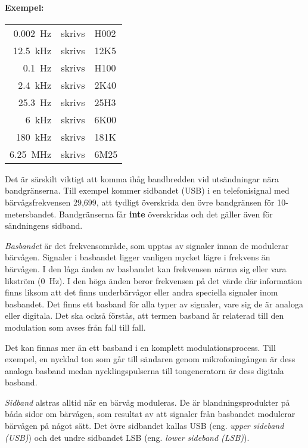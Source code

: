 \paragraph{Exempel:}

\begin{center}
\begin{tabular}{rll}
	\SI{0,002}{\hertz}     & skrivs & H002 \\
	\SI{12,5}{\kilo\hertz} & skrivs & 12K5 \\
	\SI{0,1}{\hertz}       & skrivs & H100 \\
	\SI{2,4}{\kilo\hertz}  & skrivs & 2K40 \\
	\SI{25,3}{\hertz}      & skrivs & 25H3 \\
	\SI{6}{\kilo\hertz}    & skrivs & 6K00 \\
	\SI{180}{\kilo\hertz}  & skrivs & 181K \\
	\SI{6,25}{\mega\hertz} & skrivs & 6M25 \\
\end{tabular}
\end{center}

Det är särskilt viktigt att komma ihåg bandbredden vid utsändningar nära
bandgränserna.
Till exempel kommer sidbandet (USB) i en telefonisignal med bärvågsfrekvensen 29,699,
att tydligt överskrida den övre bandgränsen för 10-metersbandet.
Bandgränserna får \textbf{inte} överskridas och det gäller även för sändningens
sidband.

\emph{Basbandet} är det frekvensområde, som upptas av signaler innan de
modulerar bärvågen.
Signaler i basbandet ligger vanligen mycket lägre i frekvens än bärvågen.
I den låga änden av basbandet kan frekvensen närma sig eller vara likström
(\SI{0}{\hertz}).
I den höga änden beror frekvensen på det värde där information finns liksom att
det finns underbärvågor eller andra speciella signaler inom basbandet.
Det finns ett basband för alla typer av signaler, vare sig de är analoga eller
digitala.
Det ska också förstås, att termen basband är relaterad till den modulation som
avses från fall till fall.

Det kan finnas mer än ett basband i en komplett modulationsprocess.
Till exempel, en nycklad ton som går till sändaren genom mikrofoningången är
dess analoga basband medan nycklingspulserna till tongeneratorn är dess digitala
basband.

\emph{Sidband} alstras alltid när en bärvåg moduleras.
De är blandningsprodukter på båda sidor om bärvågen, som resultat av att
signaler från basbandet modulerar bärvågen på något sätt.
Det övre sidbandet kallas USB (eng. \emph{upper sideband (USB)})
och det undre sidbandet LSB (eng. \emph{lower sideband (LSB)}).


